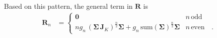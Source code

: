 \documentclass[modern]{aastex62}
\begin{document}
%
Based on this pattern, the general term in $\mathbf{R}$ is
%
\begin{align}
    \mathbf{R}_n & =
    \begin{cases}
        \mathbf{0}                                                                                                                       & n \, \mathrm{odd}
        \\
        n g_{n} \, (\pmb{\Sigma} \, \mathbf{J}_K)^\frac{n}{2}\pmb{\Sigma} + g_{n} \, \mathrm{sum}(\pmb{\Sigma})^\frac{n}{2} \pmb{\Sigma} & n \, \mathrm{even}
        \quad.
    \end{cases}
\end{align}


\end{document}

